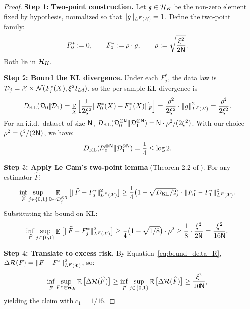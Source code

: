 \documentclass[11pt]{article}
\theoremstyle{plain}
\newcommand{\wh}{\widehat}
\renewcommand{\hat}{\wh}
\DeclareMathOperator*{\E}{{\mathbb{E}}}
\begin{document}
\begin{proof}
    \textbf{Step 1: Two-point construction.} Let $g\in {\cal H}_K$ be the non-zero element fixed by hypothesis, normalized so that $\|g\|_{L^F({\cal X})}=1$. Define the two-point family:
    \begin{align*}
        F_0^* := 0, \qquad F_1^* := \rho \cdot g, \qquad \rho := \sqrt{\frac{\xi^2}{2{\sf N}}}.
    \end{align*}
    Both lie in ${\cal H}_K$.

    \textbf{Step 2: Bound the KL divergence.} Under each $F_j^*$, the data law is $\mathcal{D}_j = {\cal X}\times \mathcal{N}(F_j^*(X), \xi^2 I_{Ld})$, so the per-sample KL divergence is
    \begin{align*}
        D_{\rm KL}({\cal D}_0\|{\cal D}_1) = \E_X\Big[\frac{1}{2\xi^2}\|F_0^*(X) - F_1^*(X)\|_F^2\Big] = \frac{\rho^2}{2\xi^2} \cdot \|g\|_{L^F({\cal X})}^2 = \frac{\rho^2}{2\xi^2}.
    \end{align*}
    For an i.i.d.\ dataset of size $\sf N$, $D_{\rm KL}({\cal D}_0^{\otimes {\sf N}}\|{\cal D}_1^{\otimes {\sf N}}) = {\sf N}\cdot \rho^2/(2\xi^2)$. With our choice $\rho^2 = \xi^2/(2{\sf N})$, we have:
    \begin{align*}
        D_{\rm KL}({\cal D}_0^{\otimes {\sf N}}\|{\cal D}_1^{\otimes {\sf N}}) = \frac{1}{4} \le \log 2.
    \end{align*}

    \textbf{Step 3: Apply Le Cam's two-point lemma} (Theorem 2.2 of \citealp{tsy09}). For any estimator $\hat F$:
    \begin{align*}
        \inf_{\hat F}\sup_{j\in\{0,1\}} \E_{\mathbb{D}\sim {\cal D}_j^{\otimes{\sf N}}}\big[\|\hat F-F_j^*\|_{L^F({\cal X})}^2\big] \ge \frac{1}{4}\big(1-\sqrt{D_{\rm KL}/2}\big)\cdot \|F_0^*-F_1^*\|_{L^F({\cal X})}^2.
    \end{align*}
    Substituting the bound on KL:
    \begin{align*}
        \inf_{\hat F}\sup_{j\in\{0,1\}} \E\big[\|\hat F-F_j^*\|_{L^F({\cal X})}^2\big] \ge \frac{1}{4}\big(1 - \sqrt{1/8}\big)\cdot \rho^2 \ge \frac{1}{8}\cdot \frac{\xi^2}{2{\sf N}} = \frac{\xi^2}{16{\sf N}}.
    \end{align*}

    \textbf{Step 4: Translate to excess risk.} By Equation~\eqref{eq:bound_delta_R}, $\Delta{\cal R}(F) = \|F - F^*\|_{L^F({\cal X})}^2$, so:
    \begin{align*}
        \inf_{\hat F}\sup_{F^*\in{\cal H}_K} \E\big[\Delta{\cal R}(\hat F)\big] \ge \inf_{\hat F}\sup_{j\in\{0,1\}} \E\big[\Delta{\cal R}(\hat F)\big] \ge \frac{\xi^2}{16{\sf N}},
    \end{align*}
    yielding the claim with $c_1 = 1/16$.
\end{proof}
\end{document}
